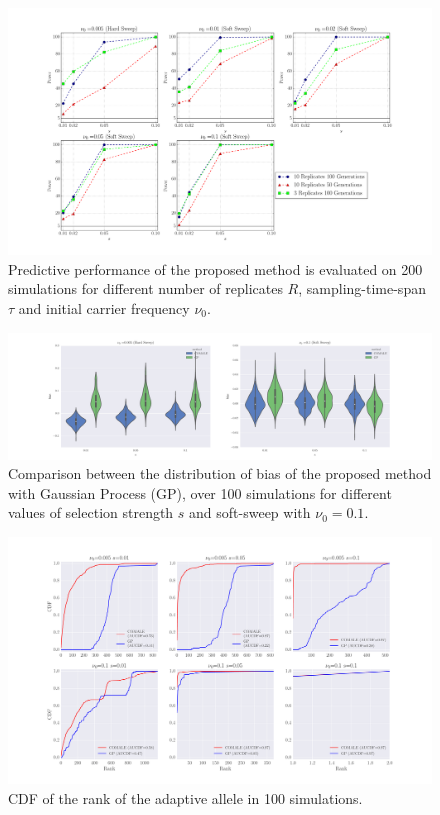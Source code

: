 \documentclass[11pt]{article}
\begin{document}
\begin{figure}[H]
	\centering
	\includegraphics[trim=2.2in 0 2.2in 0, 
	clip,width=\textwidth]{powerReplicateTime}
	\caption{Predictive performance of the proposed method is evaluated on 200 
		simulations for different number of replicates $R$, 
		sampling-time-span $\tau$ and initial carrier 
		frequency $\nu_0$.} \label{fig:powerrt}
\end{figure}
\begin{figure}[H]
	\centering
	\includegraphics[trim=2.2in 0 2.2in 0, 
	clip,width=\textwidth]{bias}
	\caption{Comparison between the distribution of bias of the proposed method 
		with Gaussian Process (GP), over 100 simulations for different values 
		of 
		selection strength $s$ and soft-sweep with $\nu_0=0.1$.} 
		\label{fig:bias}
\end{figure}



\begin{figure}[H]
	\centering
	\includegraphics[trim=.2in 0 .2in 0, 
	clip,width=\textwidth]{rank}
	\caption{CDF of the rank of the adaptive allele in 100 simulations.} 
	\label{fig:rank}
\end{figure}

%
%
%
%
\newpage


\end{document}
